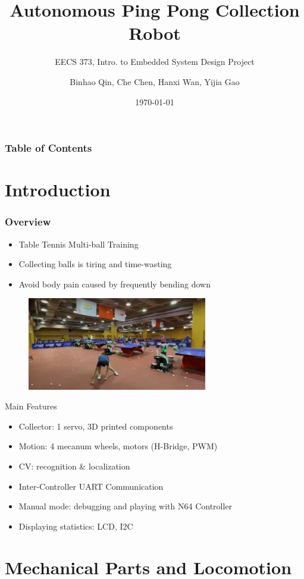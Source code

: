 \documentclass[12pt]{beamer}
\title[Ping Pong Bot]{Autonomous Ping Pong Collection Robot}
\subtitle[EECS 373 Project]{EECS 373, Intro. to Embedded System Design Project}
\author[Qin, Chen, Wan, Gao]{Binhao Qin, Che Chen, Hanxi Wan, Yijia Gao}
\date{\today}
\begin{document}
\frame{\titlepage}
\begin{frame}
    \frametitle{Table of Contents}
    \tableofcontents
\end{frame}

\section{Introduction}
\begin{frame}
    \frametitle{Overview}
    \begin{itemize}
        \item Table Tennis Multi-ball Training
        \item Collecting balls is tiring and time-wasting
        \item Avoid body pain caused by frequently bending down
    \end{itemize}
    \begin{figure}
        \centering
        \includegraphics[width=0.7\textwidth]{Picture/tableTennisPic.png}
    \end{figure}
\end{frame}

\begin{frame}{Main Features}
    \begin{itemize}
        \item Collector: 1 servo, 3D printed components
        \item Motion: 4 mecanum wheels, motors (H-Bridge, PWM)
        \item CV: recognition \& localization
        \item Inter-Controller UART Communication
        \item Manual mode: debugging and playing with N64 Controller
        \item Displaying statistics: LCD, I2C
    \end{itemize}
\end{frame}

\section{Mechanical Parts and Locomotion}
\end{document}
